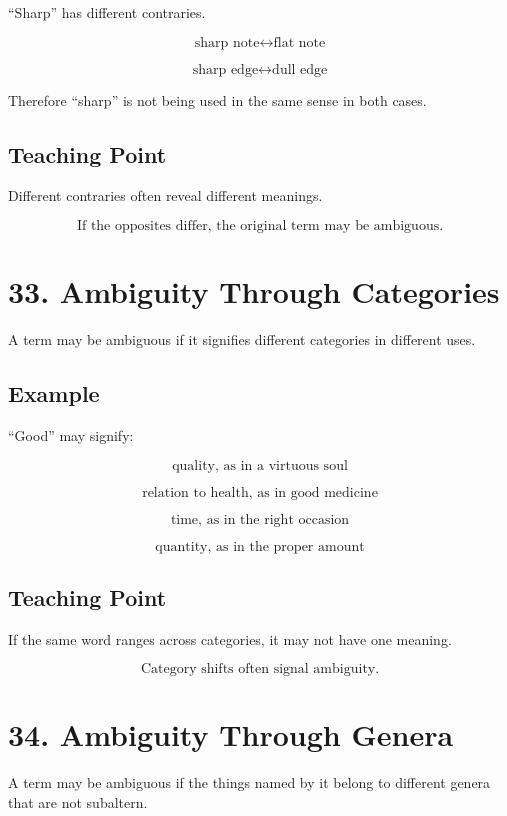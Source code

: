 \documentclass[12pt]{article}
\begin{document}
``Sharp'' has different contraries.

\[
\text{sharp note} \leftrightarrow \text{flat note}
\]

\[
\text{sharp edge} \leftrightarrow \text{dull edge}
\]

Therefore ``sharp'' is not being used in the same sense in both cases.

\subsection*{Teaching Point}

Different contraries often reveal different meanings.

\[
\boxed{
\text{If the opposites differ, the original term may be ambiguous.}
}
\]

\section*{33. Ambiguity Through Categories}

A term may be ambiguous if it signifies different categories in different uses.

\subsection*{Example}

``Good'' may signify:

\[
\text{quality, as in a virtuous soul}
\]

\[
\text{relation to health, as in good medicine}
\]

\[
\text{time, as in the right occasion}
\]

\[
\text{quantity, as in the proper amount}
\]

\subsection*{Teaching Point}

If the same word ranges across categories, it may not have one meaning.

\[
\boxed{
\text{Category shifts often signal ambiguity.}
}
\]

\section*{34. Ambiguity Through Genera}

A term may be ambiguous if the things named by it belong to different genera
that are not subaltern.
\end{document}
